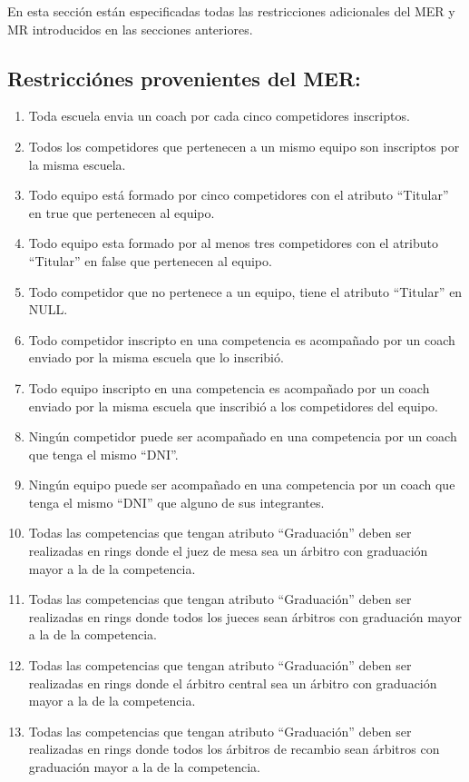 En esta sección están especificadas todas las restricciones adicionales del MER y MR introducidos en las secciones anteriores.

\subsection{Restricciónes provenientes del MER:}
\begin{enumerate}
    \item Toda escuela envia un coach por cada cinco competidores inscriptos.
    \item Todos los competidores que pertenecen a un mismo equipo son inscriptos por la misma escuela.
    \item Todo equipo está formado por cinco competidores con el atributo ``Titular'' en true que pertenecen al equipo.
    \item Todo equipo esta formado por al menos tres competidores con el atributo ``Titular'' en false que pertenecen al equipo.
    \item Todo competidor que no pertenece a un equipo, tiene el atributo ``Titular'' en NULL.
    \item Todo competidor inscripto en una competencia es acompañado por un coach enviado por la misma escuela que lo inscribió.
    \item Todo equipo inscripto en una competencia es acompañado por un coach enviado por la misma escuela que inscribió a los competidores del equipo.
    \item Ningún competidor puede ser acompañado en una competencia por un coach que tenga el mismo ``DNI''.
    \item Ningún equipo puede ser acompañado en una competencia por un coach que tenga el mismo ``DNI'' que alguno de sus integrantes.
    \item Todas las competencias que tengan atributo ``Graduación'' deben ser realizadas en rings donde el juez de mesa sea un árbitro con graduación mayor a la de la competencia.
    \item Todas las competencias que tengan atributo ``Graduación'' deben ser realizadas en rings donde todos los jueces sean árbitros con graduación mayor a la de la competencia.
    \item Todas las competencias que tengan atributo ``Graduación'' deben ser realizadas en rings donde el árbitro central sea un árbitro con graduación mayor a la de la competencia.
    \item Todas las competencias que tengan atributo ``Graduación'' deben ser realizadas en rings donde todos los árbitros de recambio sean árbitros con graduación mayor a la de la competencia.

\end{enumerate}

